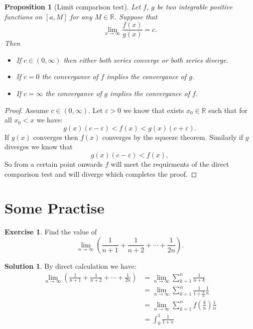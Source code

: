 \documentclass[11pt,a4paper]{article}
\theoremstyle{definition}
\newtheorem*{solution}{Solution}
\newtheorem{exercise}{Exercise}[section]
\theoremstyle{plain}
\newtheorem{proposition}[theorem]{Proposition}
\newcommand{\R}{\mathbb{R}}
\begin{document}
	\newpage
	
  \begin{proposition}[Limit comparison test]
    Let $f$, $g$ be two integrable positive functions on $[a,M]$ for any 
    $M \in \R$. Suppose that
    \[
      \lim_{x\to\infty} \frac{f(x)}{g(x)} = c.
    \]
    Then
    \begin{itemize}
      \item If $c \in (0,\infty)$ then either both series converge or both 
        series diverge.
      \item If $c = 0$ the converganve of $f$ implies the convergance of $g$.
      \item If $c = \infty$ the converganve of $g$ implies the convergance 
        of $f$.
    \end{itemize}
  \end{proposition}
  \begin{proof}
    Assume $c \in (0,\infty)$.
    Let $\varepsilon > 0$ we know that exists $x_0 \in \R$ such that for all 
    $x_0 < x$ we have:
    \[
      g(x)(c - \varepsilon) < f(x) < g(x)(c + \varepsilon).
    \]
    If $g(x)$ converges then $f(x)$ converges by the squeeze theorem.
    Similarly if $g$ diverges we know that
    \[
      g(x)(c - \varepsilon) < f(x),
    \]
    So from a certain point onwards $f$ will meet the requirments of the 
    direct comparison test and will diverge which completes the proof.
  \end{proof}
	\newpage
	
	\section{Some Practise}
  \begin{exercise}
    Find the value of
    \[
      \lim_{n\to\infty}
      \left(\frac 1{n+1} + \frac 1{n+2} + \cdots + \frac {1}{2n}\right).
    \]
  \end{exercise}
  \begin{solution}
    By direct calculation we have:
    \begin{align*}
    \lim_{n\to\infty}
    {\left(\frac {1}{n+1} + \frac {1}{n+2} + \cdots + \frac {1}{2n}\right)} 
    &= \lim_{n\to\infty}
    {\sum_{k=1}^{n}{\frac {1}{n+k}}} 
    \\
    &= \lim_{n\to\infty}
    {\sum_{k=1}^{n}{\frac {1}{1 + \frac {k}{n}}\frac {1}{n}}} 
    \\
    &= \lim_{n\to\infty}
    {\sum_{k=1}^{n} {f(\frac {k}{n})\frac {1}{n}}} 
    \\
    &= \int_{0}^{1}{\frac{1}{1+x}}
    \end{align*}
  \end{solution}
	
\end{document}
